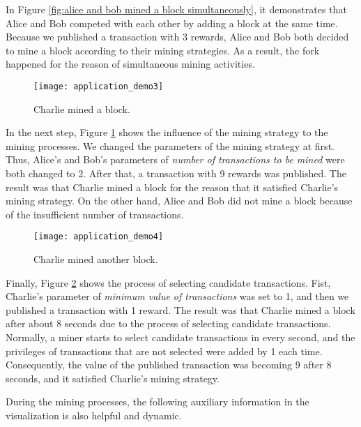 In Figure \ref{fig:alice and bob mined a block simultaneously}, it demonstrates that Alice and Bob competed with each other by adding a block at the same time. Because we published a transaction with 3 rewards, Alice and Bob both decided to mine a block according to their mining strategies. As a result, the fork happened for the reason of simultaneous mining activities.

\begin{figure}[htb]
    \centering
    \texttt{[image: application\_demo3]}
    \caption{Charlie mined a block.}
    \label{fig:charlie mined a block}
\end{figure}

In the next step, Figure \ref{fig:charlie mined a block} shows the influence of the mining strategy to the mining processes. We changed the parameters of the mining strategy at first. Thus, Alice's and Bob's parameters of \textit{number of transactions to be mined} were both changed to 2. After that, a transaction with 9 rewards was published. The result was that Charlie mined a block for the reason that it satisfied Charlie's mining strategy. On the other hand, Alice and Bob did not mine a block because of the insufficient number of transactions.

\begin{figure}[htb]
    \centering
    \texttt{[image: application\_demo4]}
    \caption{Charlie mined another block.}
    \label{fig:charlie mined another block}
\end{figure}

Finally, Figure \ref{fig:charlie mined another block} shows the process of selecting candidate transactions. Fist, Charlie's parameter of \textit{minimum value of transactions} was set to 1, and then we published a transaction with 1 reward. The result was that Charlie mined a block after about 8 seconds due to the process of selecting candidate transactions. Normally, a miner starts to select candidate transactions in every second, and the privileges of transactions that are not selected were added by 1 each time. Consequently, the value of the published transaction was becoming 9 after 8 seconds, and it satisfied Charlie's mining strategy.

During the mining processes, the following auxiliary information in the visualization is also helpful and dynamic.

